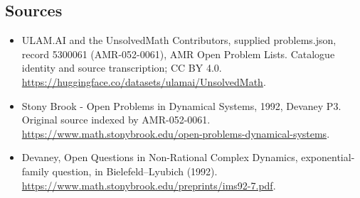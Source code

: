 \documentclass[11pt,a4paper]{article}
\begin{document}
\subsection{Sources}
\begin{itemize}
\item[S1] ULAM.AI and the UnsolvedMath Contributors, supplied problems.json, record 5300061 (AMR-052-0061), AMR Open Problem Lists. Catalogue identity and source transcription; CC BY 4.0.
\url{https://huggingface.co/datasets/ulamai/UnsolvedMath}.
\item[S2] Stony Brook - Open Problems in Dynamical Systems, 1992, Devaney P3. Original source indexed by AMR-052-0061.
\url{https://www.math.stonybrook.edu/open-problems-dynamical-systems}.
\item[S3] Devaney, Open Questions in Non-Rational Complex Dynamics, exponential-family question, in Bielefeld–Lyubich (1992).
\url{https://www.math.stonybrook.edu/preprints/ims92-7.pdf}.
\end{itemize}
\end{document}
